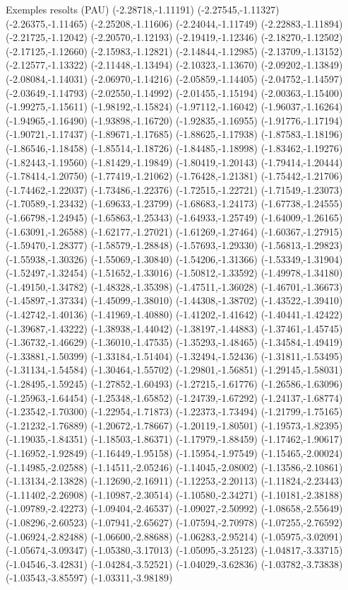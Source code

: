 \documentclass[11pt,a4paper]{article}
\begin{document}
\begin{fmex}{Exemples resolts (PAU)}
(-2.28718,-1.11191) (-2.27545,-1.11327) (-2.26375,-1.11465) (-2.25208,-1.11606) (-2.24044,-1.11749) (-2.22883,-1.11894) (-2.21725,-1.12042) (-2.20570,-1.12193) (-2.19419,-1.12346) (-2.18270,-1.12502) (-2.17125,-1.12660) (-2.15983,-1.12821) (-2.14844,-1.12985) (-2.13709,-1.13152) (-2.12577,-1.13322) (-2.11448,-1.13494) (-2.10323,-1.13670) (-2.09202,-1.13849) (-2.08084,-1.14031) (-2.06970,-1.14216) (-2.05859,-1.14405) (-2.04752,-1.14597) (-2.03649,-1.14793) (-2.02550,-1.14992) (-2.01455,-1.15194) (-2.00363,-1.15400) (-1.99275,-1.15611) (-1.98192,-1.15824) (-1.97112,-1.16042) (-1.96037,-1.16264) (-1.94965,-1.16490) (-1.93898,-1.16720) (-1.92835,-1.16955) (-1.91776,-1.17194) (-1.90721,-1.17437) (-1.89671,-1.17685) (-1.88625,-1.17938) (-1.87583,-1.18196) (-1.86546,-1.18458) (-1.85514,-1.18726) (-1.84485,-1.18998) (-1.83462,-1.19276) (-1.82443,-1.19560) (-1.81429,-1.19849) (-1.80419,-1.20143) (-1.79414,-1.20444) (-1.78414,-1.20750) (-1.77419,-1.21062) (-1.76428,-1.21381) (-1.75442,-1.21706) (-1.74462,-1.22037) (-1.73486,-1.22376) (-1.72515,-1.22721) (-1.71549,-1.23073) (-1.70589,-1.23432) (-1.69633,-1.23799) (-1.68683,-1.24173) (-1.67738,-1.24555) (-1.66798,-1.24945) (-1.65863,-1.25343) (-1.64933,-1.25749) (-1.64009,-1.26165) (-1.63091,-1.26588) (-1.62177,-1.27021) (-1.61269,-1.27464) (-1.60367,-1.27915) (-1.59470,-1.28377) (-1.58579,-1.28848) (-1.57693,-1.29330) (-1.56813,-1.29823) (-1.55938,-1.30326) (-1.55069,-1.30840) (-1.54206,-1.31366) (-1.53349,-1.31904) (-1.52497,-1.32454) (-1.51652,-1.33016) (-1.50812,-1.33592) (-1.49978,-1.34180) (-1.49150,-1.34782) (-1.48328,-1.35398) (-1.47511,-1.36028) (-1.46701,-1.36673) (-1.45897,-1.37334) (-1.45099,-1.38010) (-1.44308,-1.38702) (-1.43522,-1.39410) (-1.42742,-1.40136) (-1.41969,-1.40880) (-1.41202,-1.41642) (-1.40441,-1.42422) (-1.39687,-1.43222) (-1.38938,-1.44042) (-1.38197,-1.44883) (-1.37461,-1.45745) (-1.36732,-1.46629) (-1.36010,-1.47535) (-1.35293,-1.48465) (-1.34584,-1.49419) (-1.33881,-1.50399) (-1.33184,-1.51404) (-1.32494,-1.52436) (-1.31811,-1.53495) (-1.31134,-1.54584) (-1.30464,-1.55702) (-1.29801,-1.56851) (-1.29145,-1.58031) (-1.28495,-1.59245) (-1.27852,-1.60493) (-1.27215,-1.61776) (-1.26586,-1.63096) (-1.25963,-1.64454) (-1.25348,-1.65852) (-1.24739,-1.67292) (-1.24137,-1.68774) (-1.23542,-1.70300) (-1.22954,-1.71873) (-1.22373,-1.73494) (-1.21799,-1.75165) (-1.21232,-1.76889) (-1.20672,-1.78667) (-1.20119,-1.80501) (-1.19573,-1.82395) (-1.19035,-1.84351) (-1.18503,-1.86371) (-1.17979,-1.88459) (-1.17462,-1.90617) (-1.16952,-1.92849) (-1.16449,-1.95158) (-1.15954,-1.97549) (-1.15465,-2.00024) (-1.14985,-2.02588) (-1.14511,-2.05246) (-1.14045,-2.08002) (-1.13586,-2.10861) (-1.13134,-2.13828) (-1.12690,-2.16911) (-1.12253,-2.20113) (-1.11824,-2.23443) (-1.11402,-2.26908) (-1.10987,-2.30514) (-1.10580,-2.34271) (-1.10181,-2.38188) (-1.09789,-2.42273) (-1.09404,-2.46537) (-1.09027,-2.50992) (-1.08658,-2.55649) (-1.08296,-2.60523) (-1.07941,-2.65627) (-1.07594,-2.70978) (-1.07255,-2.76592) (-1.06924,-2.82488) (-1.06600,-2.88688) (-1.06283,-2.95214) (-1.05975,-3.02091) (-1.05674,-3.09347) (-1.05380,-3.17013) (-1.05095,-3.25123) (-1.04817,-3.33715) (-1.04546,-3.42831) (-1.04284,-3.52521) (-1.04029,-3.62836) (-1.03782,-3.73838) (-1.03543,-3.85597) (-1.03311,-3.98189) 
\end{fmex}
\end{document}
